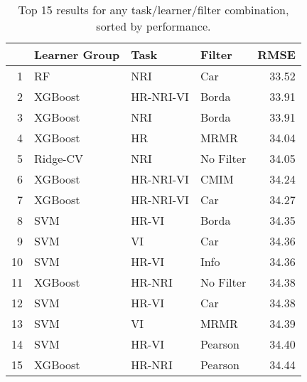 \begin{table}[ht!]
\centering
\caption{Top 15 results for any task/learner/filter combination, sorted by performance.} 
\label{tab:perf-top-15}
\begin{tabular}{rlllr}
  \hline
 & Learner Group & Task & Filter & RMSE \\ 
  \hline
1 & RF & NRI & Car & 33.52 \\ 
  2 & XGBoost & HR-NRI-VI & Borda & 33.91 \\ 
  3 & XGBoost & NRI & Borda & 33.91 \\ 
  4 & XGBoost & HR & MRMR & 34.04 \\ 
  5 & Ridge-CV & NRI & No Filter & 34.05 \\ 
  6 & XGBoost & HR-NRI-VI & CMIM & 34.24 \\ 
  7 & XGBoost & HR-NRI-VI & Car & 34.27 \\ 
  8 & SVM & HR-VI & Borda & 34.35 \\ 
  9 & SVM & VI & Car & 34.36 \\ 
  10 & SVM & HR-VI & Info & 34.36 \\ 
  11 & XGBoost & HR-NRI & No Filter & 34.38 \\ 
  12 & SVM & HR-VI & Car & 34.38 \\ 
  13 & SVM & VI & MRMR & 34.39 \\ 
  14 & SVM & HR-VI & Pearson & 34.40 \\ 
  15 & XGBoost & HR-NRI & Pearson & 34.44 \\ 
   \hline
\end{tabular}
\end{table}
